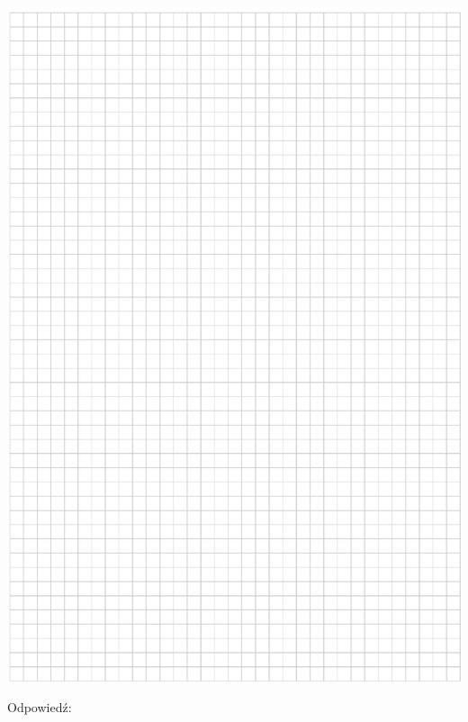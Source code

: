 \documentclass[10pt]{article}
\begin{document}
\begin{center}
\includegraphics[max width=\textwidth]{2024_11_21_d9af6ed2d610d3f2d2cbg-07}
\end{center}

Odpowiedź:
\end{document}
